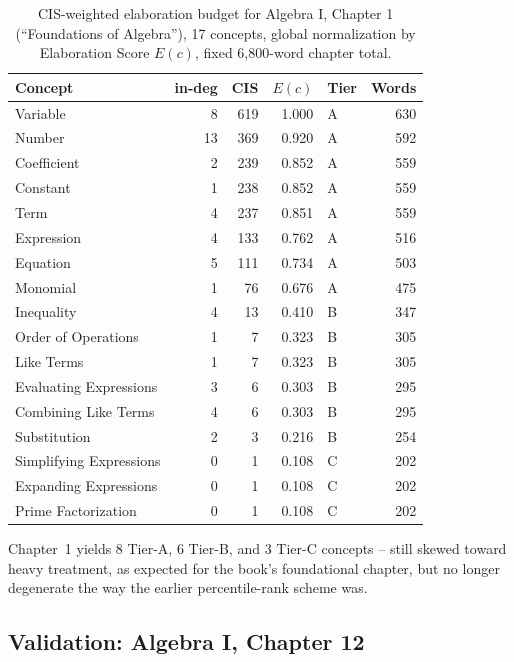 \begin{table}[htbp]
\centering
\caption{CIS-weighted elaboration budget for Algebra I, Chapter 1 (``Foundations of Algebra''), 17 concepts, global normalization by Elaboration Score $E(c)$, fixed 6{,}800-word chapter total.}
\label{tab:ch1-budget}
\begin{tabular}{lrrrl r}
\toprule
Concept & in-deg & CIS & $E(c)$ & Tier & Words \\
\midrule
Variable                & 8  & 619 & 1.000 & A & 630 \\
Number                   & 13 & 369 & 0.920 & A & 592 \\
Coefficient              & 2  & 239 & 0.852 & A & 559 \\
Constant                 & 1  & 238 & 0.852 & A & 559 \\
Term                     & 4  & 237 & 0.851 & A & 559 \\
Expression               & 4  & 133 & 0.762 & A & 516 \\
Equation                 & 5  & 111 & 0.734 & A & 503 \\
Monomial                 & 1  & 76  & 0.676 & A & 475 \\
Inequality               & 4  & 13  & 0.410 & B & 347 \\
Order of Operations      & 1  & 7   & 0.323 & B & 305 \\
Like Terms               & 1  & 7   & 0.323 & B & 305 \\
Evaluating Expressions   & 3  & 6   & 0.303 & B & 295 \\
Combining Like Terms     & 4  & 6   & 0.303 & B & 295 \\
Substitution              & 2  & 3   & 0.216 & B & 254 \\
Simplifying Expressions  & 0  & 1   & 0.108 & C & 202 \\
Expanding Expressions    & 0  & 1   & 0.108 & C & 202 \\
Prime Factorization      & 0  & 1   & 0.108 & C & 202 \\
\bottomrule
\end{tabular}
\end{table}

Chapter~1 yields 8 Tier-A, 6 Tier-B, and 3 Tier-C concepts -- still skewed
toward heavy treatment, as expected for the book's foundational chapter, but
no longer degenerate the way the earlier percentile-rank scheme was.

\subsection{Validation: Algebra I, Chapter 12}

